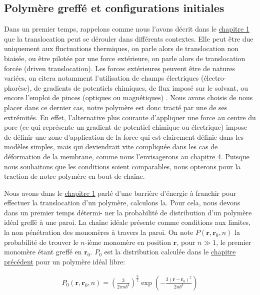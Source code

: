 \subsection{Polymère greffé et configurations initiales}

Dans un premier temps, rappelons comme nous l'avons décrit dans le \hyperref[intro]{chapitre 1} que la translocation peut se dérouler dans différents contextes. Elle peut être due uniquement aux fluctuations thermiques, on parle alors de translocation non biaisée, ou être pilotée par une force extérieure, on parle alors de translocation forcée (driven translocation). Les forces extérieures peuvent être de natures variées, on citera notamment l'utilisation de champs électriques (électro- phorèse), de gradients de potentiels chimiques, de flux imposé sur le solvant, ou encore l'emploi de pinces (optiques ou magnétiques) \cite{keyser}. Nous avons choisis de nous placer dans ce dernier cas, notre polymère est donc tracté par une de ses extrémités. En effet, l'alternative plus courante d'appliquer une force au centre du pore (ce qui représente un gradient de potentiel chimique ou électrique) impose de définir une zone d'application de la force qui est clairement définie dans les modèles simples, mais qui deviendrait vite compliquée dans les cas de déformation de la membrane, comme nous l'envisagerons au \hyperref[chapitrememflex]{chapitre 4}. Puisque nous souhaitons que les conditions soient comparables, nous opterons pour la traction de notre polymère en bout de chaîne.



Nous avons dans le \hyperref[intro]{chapitre 1} parlé d'une barrière d'énergie à franchir pour effectuer la translocation d'un polymère, calculons la. Pour cela, nous devons dans un premier temps détermi- ner la probabilité de distribution d'un polymère idéal greffé à une paroi. La chaîne idéale présente comme conditions aux limites, la non pénétration des monomères à travers la paroi. On note $P(\textbf{r},\textbf{r}_0,n)$ la probabilité de trouver le $n$-ième monomère en position $\textbf{r}$, pour $n \gg 1$, le premier monomère étant greffé en $\textbf{r}_0$. $P_0$ est la distribution calculée dans le \hyperref[eqdif]{chapitre précédent} pour un polymère idéal libre:

\begin{eqnarray}
P_0(\textbf{r},\textbf{r}_0,n)=\left(\frac{3}{2\pi n b^2}\right)^\frac{3}{2}\exp\left(-\frac{3(\textbf{r}-\textbf{r}_0)^2}{2 n b^2}\right)
\end{eqnarray}


